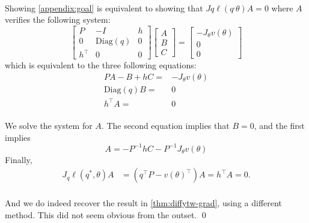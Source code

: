 \paragraph{}
Showing \cref{appendix:goal} is equivalent to showing that $Jq\ell(q^, \theta)A = 0$ where $A$ verifies the following system:
\begin{equation}
\begin{bmatrix}
    P & - I & h\\
    0 & \mathrm{Diag}(q)& 0\\
    h^\top  & 0 & 0
    \end{bmatrix}
\begin{bmatrix}
    A \\
    B \\
    C
    \end{bmatrix} =
\begin{bmatrix}
    - J_\theta v(\theta) \\
    0 \\
    0
    \end{bmatrix}
\end{equation}
which is equivalent to the three following equations:
\begin{align}
   PA - B + hC =& -J_\theta v(\theta)\\
   \mathrm{Diag}(q)B =& 0\\
   h^\top A =& 0
\end{align}

\paragraph{}
We solve the system for $A$. The second equation implies that $B=0$, and the first implies
\begin{equation}
    A = - P^{-1}hC - P^{-1}J_\theta v(\theta)
\end{equation}
Finally,
\begin{align}
    J_q\ell(q^*,\theta)A &= (q^\top P - v(\theta)^\top )A = h^\top A = 0.
\end{align}
\paragraph{}
And we do indeed recover the result in \cref{thm:diffytw-grad}, using a different method. This did not seem obvious from the outset.
\qed
